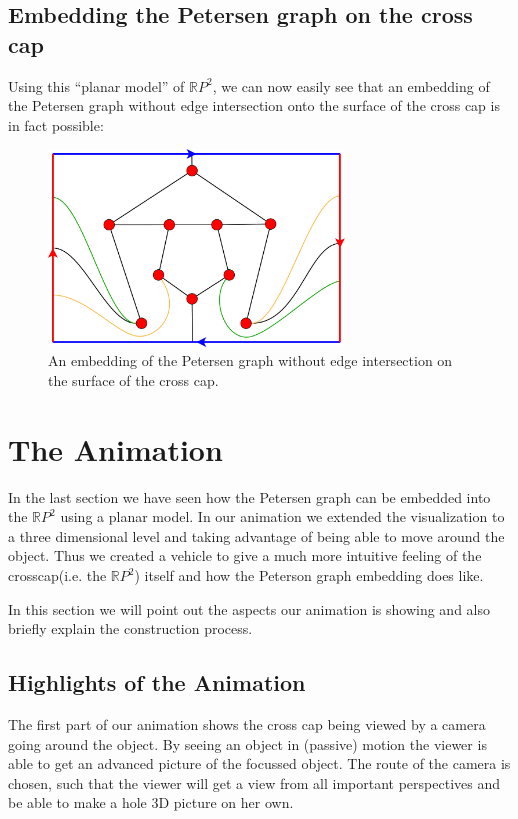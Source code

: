\documentclass[12pt,            %
               a4paper,         %
               oneside,         %
               DIV12,           %
               fleqn,           %
               halfparskip,     %
               nochapterprefix, %
               bibtotocnumbered,%
              ]{scrartcl} %
\theoremstyle{definition}
\begin{document}
\subsection{Embedding the Petersen graph on the cross cap}

Using this “planar model” of $\mathbb{R}P^2$, we can now easily see
that an embedding of the Petersen graph without edge intersection
onto the surface of the cross cap is in fact possible:

\begin{figure}[h]
  \centering
  \includegraphics[keepaspectratio=true,width=0.7\textwidth]{../planar-graphs/crosscap-embedding-5.pdf}
  \caption{An embedding of the Petersen graph without edge
    intersection on the surface of the cross cap.}
  \label{fig:rp2-embedding}
\end{figure}

\section{The Animation}

In the last section we have seen how the Petersen graph can be embedded into the $\mathbb{R}P^2$ using a planar model. In our  animation we extended the visualization to a three dimensional level and taking advantage of being able to move around the object. Thus we created a vehicle to give a much more intuitive feeling of the crosscap(i.e. the $\mathbb{R}P^2$) itself and how the Peterson graph embedding does like.

In this section we will point out the aspects our animation is showing and also briefly explain the construction process.

\subsection{Highlights of the Animation}

The first part of our animation shows the cross cap being viewed by a camera going around the object. By seeing an object in (passive) motion the viewer is able to get an advanced picture of the focussed object. The route of the camera is chosen, such that the viewer will get a view from all important perspectives and be able to make a hole 3D picture on her own.
\end{document}
